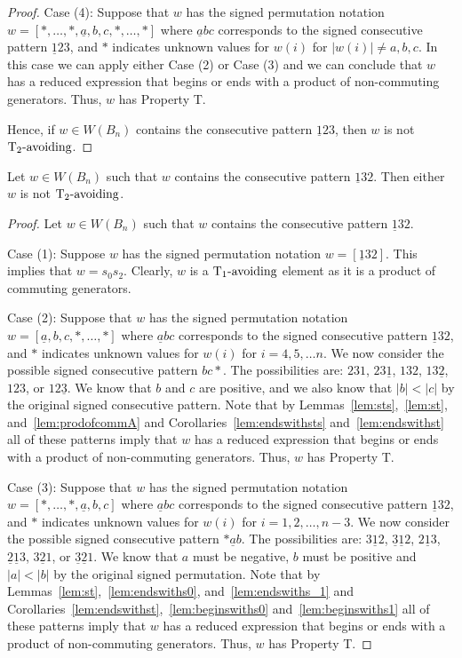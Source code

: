 \begin{lemma}
\begin{proof}
	Case (4): Suppose that $w$ has the signed permutation notation $w=[\ast, \ldots, \ast, \underline{a},b,c, \ast, \ldots, \ast]$ where $\underline{a}bc$ corresponds to the signed consecutive pattern $\underline{1}23$, and $\ast$ indicates unknown values for $w(i)$ for $|w(i)|\neq a,b,c$. In this case we can apply either Case (2) or Case (3) and we can conclude that $w$ has a reduced expression that begins or ends with a product of non-commuting generators. Thus, $w$ has Property T.

	Hence, if $w \in W(B_n)$ contains the consecutive pattern $\underline{1}23$, then $w$ is not $\operatorname{T_2-\mathrm{avoiding}}$.
\end{proof}	
\end{lemma}

\begin{lemma}\label{lem:132}
Let $w \in W(B_n)$ such that $w$ contains the consecutive pattern $\underline{1}32$. Then either $w$ is not $\operatorname{T_2-\mathrm{avoiding}}$.
\begin{proof}
	Let $w \in W(B_n)$ such that $w$ contains the consecutive pattern $\underline{1}32$.
	
	Case (1): Suppose $w$ has the signed permutation notation $w=[\underline{1}32]$. This implies that $w=s_0s_2$. Clearly, $w$ is a $\operatorname{T_1-\mathrm{avoiding}}$ element as it is a product of commuting generators.
	
	Case (2): Suppose that $w$ has the signed permutation notation $w=[\underline{a},b,c, \ast, \ldots, \ast]$ where $\underline{a}bc$ corresponds to the signed consecutive pattern $\underline{1}32$, and $\ast$ indicates unknown values for $w(i)$ for $i=4,5, \ldots n$. We now consider the possible signed consecutive pattern $bc \ast$. The possibilities are: $231$, $23 \underline{1}$, $13 2$, $13 \underline{2}$, $123$, or $12\underline{3}$. We know that $b$ and $c$ are positive, and we also know that $|b|<|c|$ by the original signed consecutive pattern. Note that by Lemmas~\ref{lem:sts},~\ref{lem:st}, and~\ref{lem:prodofcommA} and Corollaries~\ref{lem:endswithsts} and~\ref{lem:endswithst} all of these patterns imply that $w$ has a reduced expression that begins or ends with a product of non-commuting generators. Thus, $w$ has Property T.
	
	Case (3): Suppose that $w$ has the signed permutation notation $w=[\ast, \ldots, \ast, \underline{a},b,c]$ where $\underline{a}bc$ corresponds to the signed consecutive pattern $\underline{1}32$, and $\ast$ indicates unknown values for $w(i)$ for $i=1,2, \ldots ,n-3$. We now consider the possible signed consecutive pattern $\ast \underline{a} b$. The possibilities are: $3 \underline{1} 2$, $\underline{3} \underline{1} 2$, $2 \underline{1} 3$, $\underline{2} \underline{1} 3$, $3 \underline{2} 1$, or $\underline{3} \underline{2} 1$. We know that $a$ must be negative, $b$ must be positive and $|a|<|b|$ by the original signed permutation. Note that by Lemmas~\ref{lem:st},~\ref{lem:endswiths0}, and~\ref{lem:endswiths_1} and Corollaries~\ref{lem:endswithst},~\ref{lem:beginswiths0} and~\ref{lem:beginswiths1} all of these patterns imply that $w$ has a reduced expression that begins or ends with a product of non-commuting generators. Thus, $w$ has Property T. 
	

\end{proof}
\end{lemma}
